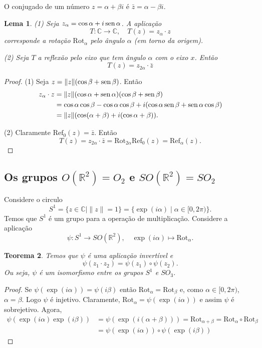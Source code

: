 \documentclass[12pt]{amsart}
\newcommand{\C}{\mathbb C}
\newcommand{\R}{\mathbb R}
\DeclareMathOperator{\sen}{\textrm{\rm sen}}
\newcommand{\rot}[1]{{\textrm{Rot}}_{#1}}
\newcommand{\refl}[1]{{\textrm{Ref}}_{#1}}
\newtheorem{theorem}{Teorema}
\newtheorem{lemma}[theorem]{Lema}
\theoremstyle{definition}
\begin{document}
O conjugado de um número $z=\alpha+\beta i$ é $\bar z=\alpha-\beta i$. 

\begin{lemma}
    (1) Seja $z_\alpha=\cos\alpha+i\sen\alpha$. A aplicação 
    \[
        T:\C\to\C,\quad T(z)=z_\alpha\cdot z
    \] 
corresponde a rotação $\rot\alpha$ pelo ângulo $\alpha$ (em torno da origem). 

(2) Seja $T$ a reflexão pelo eixo que tem ângulo $\alpha$ com o eixo $x$. Então 
\[
    T(z)=z_{2\alpha}\cdot \bar z
\]
 \end{lemma}
 \begin{proof}
(1) Seja $z=\|z\|(\cos\beta+\sen\beta)$. Então 
\begin{align*}
    z_\alpha\cdot z&=\|z\|(\cos\alpha+\sen\alpha)(\cos\beta+\sen\beta)\\&=
    \cos\alpha\cos\beta-\cos\alpha\cos\beta+i(\cos\alpha\sen\beta+\sen\alpha\cos\beta)\\&=
    \|z\|(\cos(\alpha+\beta)+i(\cos\alpha+\beta)).
\end{align*}
 
(2) Claramente $\refl 0(z)=\bar z$. Então 
\[
    T(z)=z_{2\alpha}\cdot \bar z=\rot{2\alpha}\refl 0(z)=\refl{\alpha}(z).
\]
 \end{proof}

 \subsection{Os grupos $O(\R^2)=O_2$ e $SO(\R^2)=SO_2$}
 Considere o circulo 
 \[
S^1=\{z\in\C\mid \|z\|=1\}=\{\exp(i\alpha)\mid \alpha\in[0,2\pi)\}.
\]
Temos que $S^1$ é um grupo para a operação de multiplicação. Considere a aplicação
\[
    \psi: S^1\to SO(\R^2),\quad \exp(i\alpha)\mapsto \rot\alpha.
\]
\begin{theorem}
    Temos que $\psi$ é uma aplicação invertível e 
    \[
        \psi(z_1\cdot z_2)=\psi(z_1)\circ \psi(z_2).
    \]
    Ou seja, $\psi$ é um isomorfismo entre os grupos $S^1$ e $SO_3$.
\end{theorem}
\begin{proof}
    Se $\psi(\exp(i\alpha))=\psi(i\beta)$ então $\rot\alpha=\rot\beta$ e, como $\alpha\in[0,2\pi)$, 
    $\alpha=\beta$.  Logo $\psi$ é injetivo. Claramente, $\rot\alpha=\psi(\exp(i\alpha))$ e assim 
    $\psi$ é sobrejetivo.  Agora, 
    \begin{align*}
        \psi(\exp(i\alpha)\exp(i\beta))&=\psi(\exp(i(\alpha+\beta)))=\rot{\alpha+\beta}=\rot\alpha\circ
        \rot\beta\\&=\psi(\exp(i\alpha))\circ\psi(\exp(i\beta))
    \end{align*}
\end{proof}
\end{document}
